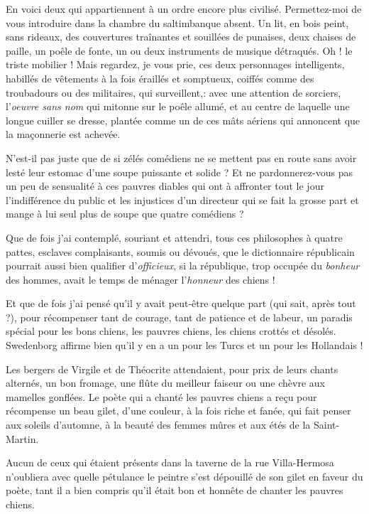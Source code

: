 En voici deux qui appartiennent à un ordre encore plus civilisé.
Permettez{}-moi de vous introduire dans la chambre du saltimbanque
absent. Un lit, en bois peint, sans rideaux, des couvertures traînantes
et souillées de punaises, deux chaises de paille, un poêle de fonte, un
ou deux instruments de musique détraqués. Oh ! le triste mobilier !
Mais regardez, je vous prie, ces deux personnages intelligents,
habillés de vêtements à la fois éraillés et somptueux, coiffés comme
des troubadours ou des militaires, qui surveillent,: avec une attention
de sorciers, l’\textit{oeuvre sans nom} qui mitonne sur le
poêle allumé, et au centre de laquelle une longue cuiller se dresse,
plantée comme un de ces mâts aériens qui annoncent que la maçonnerie
est achevée. 

N’est{}-il pas juste que de si zélés comédiens ne se
mettent pas en route sans avoir lesté leur estomac
d’une soupe puissante et solide ? Et ne
pardonnerez{}-vous pas un peu de sensualité à ces pauvres diables qui
ont à affronter tout le jour l’indifférence du public
et les injustices d’un directeur qui se fait la grosse
part et mange à lui seul plus de soupe que quatre comédiens ?

Que de fois j’ai contemplé, souriant et attendri, tous
ces philosophes à quatre pattes, esclaves complaisants, soumis ou
dévoués, que le dictionnaire républicain pourrait aussi bien qualifier
d’\textit{officieux}, si la république, trop occupée du \textit{bonheur}
des hommes, avait le temps de ménager l’\textit{honneur} des
chiens !

Et que de fois j’ai pensé qu’il y
avait peut{}-être quelque part (qui sait, après tout ?), pour
récompenser tant de courage, tant de patience et de labeur, un paradis
spécial pour les bons chiens, les pauvres chiens, les chiens crottés et
désolés. Swedenborg affirme bien qu’il y en a un pour
les Turcs et un pour les Hollandais !

Les bergers de Virgile et de Théocrite attendaient, pour prix de leurs
chants alternés, un bon fromage, une flûte du meilleur faiseur ou une
chèvre aux mamelles gonflées. Le poète qui a chanté les pauvres chiens
a reçu pour récompense un beau gilet, d’une couleur, à
la fois riche et fanée, qui fait penser aux soleils
d’automne, à la beauté des femmes mûres et aux étés de
la Saint{}-Martin.

Aucun de ceux qui étaient présents dans la taverne de la rue
Villa{}-Hermosa n’oubliera avec quelle pétulance le
peintre s’est dépouillé de son gilet en faveur du
poète, tant il a bien compris qu’il était bon et
honnête de chanter les pauvres chiens.

